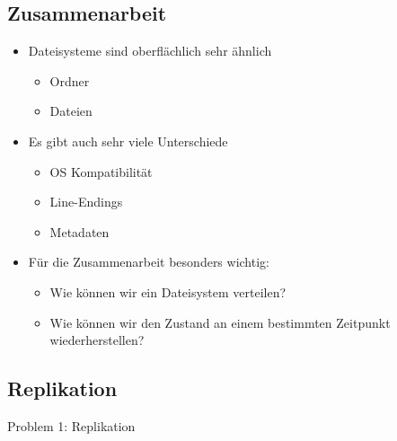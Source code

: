 \subsection{Zusammenarbeit}\label{subsec:zusammenarbeit}

\begin{frame}
    \slidehead
    \begin{itemize}[<+->]
        \item Dateisysteme sind oberflächlich sehr ähnlich
        \begin{itemize}
            \item Ordner
            \item Dateien
        \end{itemize}
        \item Es gibt auch sehr viele Unterschiede
        \begin{itemize}
            \item OS Kompatibilität
            \item Line-Endings
            \item Metadaten
        \end{itemize}
        \item Für die Zusammenarbeit besonders wichtig:
        \begin{itemize}
            \item Wie können wir ein Dateisystem verteilen?
            \item Wie können wir den Zustand an einem bestimmten Zeitpunkt wiederherstellen?
        \end{itemize}
    \end{itemize}
\end{frame}

\subsection{Replikation}\label{subsec:replikation}

\begin{frame}[c]
    \slidehead
    \centering
    \Large
    Problem 1: Replikation
\end{frame}

